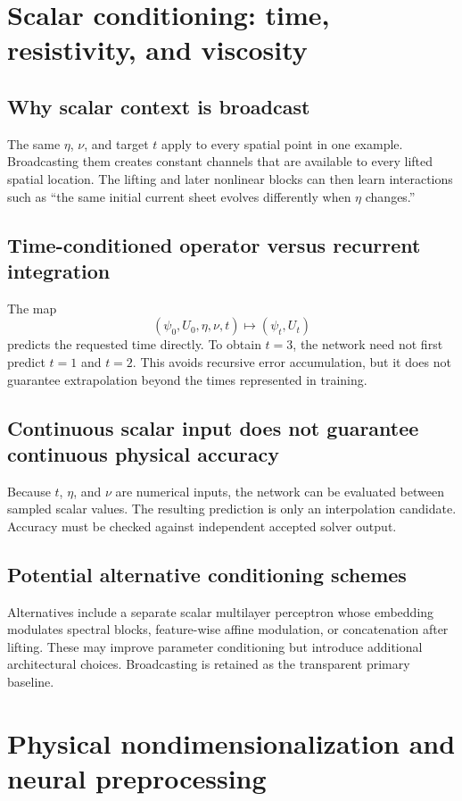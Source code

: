 \documentclass[11pt]{article}
\begin{document}
\section{Scalar conditioning: time, resistivity, and viscosity}
\label{sec:conditioning}

\subsection{Why scalar context is broadcast}
The same $\eta$, $\nu$, and target $t$ apply to every spatial point in one example. Broadcasting them creates constant channels that are available to every lifted spatial location. The lifting and later nonlinear blocks can then learn interactions such as ``the same initial current sheet evolves differently when $\eta$ changes.''

\subsection{Time-conditioned operator versus recurrent integration}
The map
\[
(\psi_0,U_0,\eta,\nu,t)\mapsto(\psi_t,U_t)
\]
predicts the requested time directly. To obtain $t=3$, the network need not first predict $t=1$ and $t=2$. This avoids recursive error accumulation, but it does not guarantee extrapolation beyond the times represented in training.

\subsection{Continuous scalar input does not guarantee continuous physical accuracy}
Because $t$, $\eta$, and $\nu$ are numerical inputs, the network can be evaluated between sampled scalar values. The resulting prediction is only an interpolation candidate. Accuracy must be checked against independent accepted solver output.

\subsection{Potential alternative conditioning schemes}
Alternatives include a separate scalar multilayer perceptron whose embedding modulates spectral blocks, feature-wise affine modulation, or concatenation after lifting. These may improve parameter conditioning but introduce additional architectural choices. Broadcasting is retained as the transparent primary baseline.

\section{Physical nondimensionalization and neural preprocessing}
\label{sec:preprocess}
\end{document}
